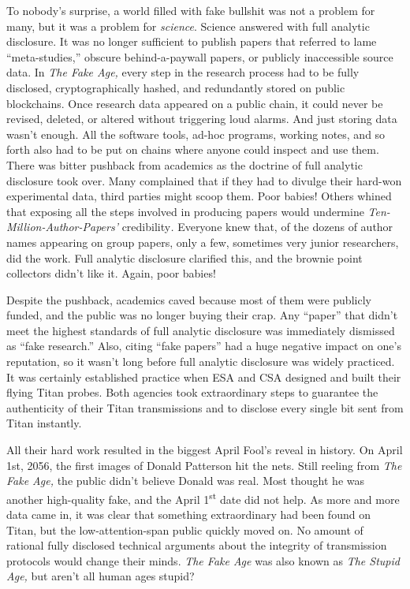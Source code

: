 To nobody's surprise, a world filled with fake bullshit was not a
problem for many, but it was a problem for \emph{science}. Science
answered with full analytic disclosure. It was no longer sufficient to
publish papers that referred to lame ``meta-studies,'' obscure
behind-a-paywall papers, or publicly inaccessible source data. In
\emph{The Fake Age,} every step in the research process had to be fully
disclosed, cryptographically hashed, and redundantly stored on public
blockchains. Once research data appeared on a public chain, it could
never be revised, deleted, or altered without triggering loud alarms.
And just storing data wasn't enough. All the software tools, ad-hoc
programs, working notes, and so forth also had to be put on chains where
anyone could inspect and use them. There was bitter pushback from
academics as the doctrine of full analytic disclosure took over. Many
complained that if they had to divulge their hard-won experimental data,
third parties might scoop them. Poor babies! Others whined that exposing
all the steps involved in producing papers would undermine
\emph{Ten-Million-Author-Papers'} credibility\emph{.} Everyone knew
that, of the dozens of author names appearing on group papers, only a
few, sometimes very junior researchers, did the work. Full analytic
disclosure clarified this, and the brownie point collectors didn't like
it. Again, poor babies!

Despite the pushback, academics caved because most of them were publicly
funded, and the public was no longer buying their crap. Any ``paper''
that didn't meet the highest standards of full analytic disclosure was
immediately dismissed as ``fake research.'' Also, citing ``fake papers''
had a huge negative impact on one's reputation, so it wasn't long before
full analytic disclosure was widely practiced. It was certainly
established practice when ESA and CSA designed and built their flying
Titan probes. Both agencies took extraordinary steps to guarantee the
authenticity of their Titan transmissions and to disclose every single
bit sent from Titan instantly.

All their hard work resulted in the biggest April Fool's reveal in
history. On April 1st, 2056, the first images of Donald Patterson hit
the nets. Still reeling from \emph{The Fake Age,} the public didn't
believe Donald was real. Most thought he was another high-quality fake,
and the April 1\textsuperscript{st} date did not help. As more and more
data came in, it was clear that something extraordinary had been found
on Titan, but the low-attention-span public quickly moved on. No amount
of rational fully disclosed technical arguments about the integrity of
transmission protocols would change their minds. \emph{The Fake Age} was
also known as \emph{The Stupid Age,} but aren't all human ages stupid?

